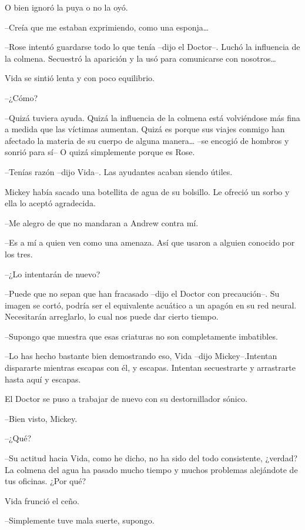 {O bien ignoró la puya o no la oyó.}

{--Creía que me estaban exprimiendo, como una esponja\ldots{}}

{--Rose intentó guardarse todo lo que tenía --dijo el Doctor--. Luchó la
 influencia de la colmena. Secuestró la aparición y la usó para
 comunicarse con nosotros\ldots{}}

{Vida se sintió lenta y con poco equilibrio.}

{--¿Cómo?}

{--Quizá tuviera ayuda. Quizá la influencia de la colmena está
 volviéndose más fina a medida que las víctimas aumentan. Quizá es porque
 sus viajes conmigo han afectado la materia de su cuerpo de alguna
 manera\ldots{} --se encogió de hombros y sonrió para sí-- O quizá
simplemente porque es Rose.}

{--Tenías razón --dijo Vida--. Las ayudantes acaban siendo útiles.}

{Mickey había sacado una botellita de agua de su bolsillo. Le ofreció un
sorbo y ella lo aceptó agradecida.}

{--Me alegro de que no mandaran a Andrew contra mí.}

{--Es a mí a quien ven como una amenaza. Así que usaron a alguien
conocido por los tres.}

{--¿Lo intentarán de nuevo?}

{--Puede que no sepan que han fracasado --dijo el Doctor con
 precaución--. Su imagen se cortó, podría ser el equivalente acuático a
 un apagón en su red neural. Necesitarán arreglarlo, lo cual nos puede
dar cierto tiempo.}

{--Supongo que muestra que esas criaturas no son completamente
imbatibles.}

{--Lo has hecho bastante bien demostrando eso, Vida --dijo
 Mickey--.Intentan dispararte mientras escapas con él, y escapas.
Intentan secuestrarte y arrastrarte hasta aquí y escapas.}

{El Doctor se puso a trabajar de nuevo con su destornillador sónico.}

{--Bien visto, Mickey.}

{--¿Qué?}

{--Su actitud hacia Vida, como he dicho, no ha sido del todo
 consistente, ¿verdad? La colmena del agua ha pasado mucho tiempo y
muchos problemas alejándote de tus oficinas. ¿Por qué?}

{Vida frunció el ceño.}

{--Simplemente tuve mala suerte, supongo.}

